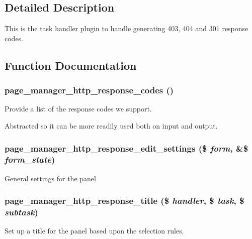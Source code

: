 \subsection{Detailed Description}
This is the task handler plugin to handle generating 403, 404 and 301 response codes. 

\subsection{Function Documentation}
\hypertarget{http__response_8inc_a4e23931f8f0b06937eeb34e64c74eae9}{
\subsubsection[{page\_\-manager\_\-http\_\-response\_\-codes}]{\setlength{\rightskip}{0pt plus 5cm}page\_\-manager\_\-http\_\-response\_\-codes ()}}
\label{http__response_8inc_a4e23931f8f0b06937eeb34e64c74eae9}
Provide a list of the response codes we support.

Abstracted so it can be more readily used both on input and output. \hypertarget{http__response_8inc_acaccd5ee81afb68b234c1a49f036cda3}{
\subsubsection[{page\_\-manager\_\-http\_\-response\_\-edit\_\-settings}]{\setlength{\rightskip}{0pt plus 5cm}page\_\-manager\_\-http\_\-response\_\-edit\_\-settings (\$ {\em form}, \/  \&\$ {\em form\_\-state})}}
\label{http__response_8inc_acaccd5ee81afb68b234c1a49f036cda3}
General settings for the panel \hypertarget{http__response_8inc_ac070590f089da932568b8a02349b17af}{
\subsubsection[{page\_\-manager\_\-http\_\-response\_\-title}]{\setlength{\rightskip}{0pt plus 5cm}page\_\-manager\_\-http\_\-response\_\-title (\$ {\em handler}, \/  \$ {\em task}, \/  \$ {\em subtask})}}
\label{http__response_8inc_ac070590f089da932568b8a02349b17af}
Set up a title for the panel based upon the selection rules. 